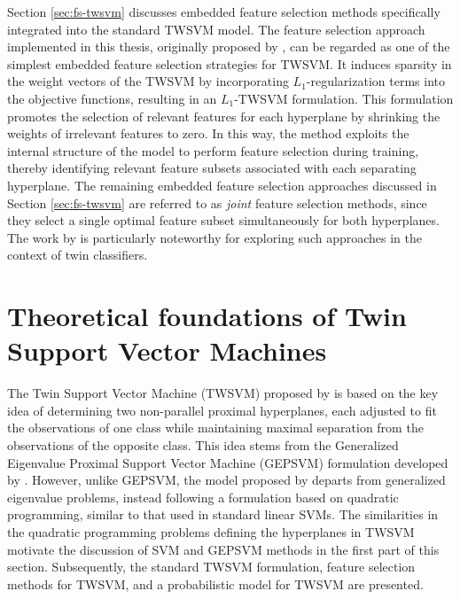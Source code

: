 \documentclass[12pt]{report} %
\begin{document}
Section \ref{sec:fs-twsvm} discusses embedded feature selection methods specifically integrated into the standard TWSVM model. The feature selection approach implemented in this thesis, originally proposed by \cite{bai2014novel}, can be regarded as one of the simplest embedded feature selection strategies for TWSVM. It induces sparsity in the weight vectors of the TWSVM by incorporating $L_1$-regularization terms into the objective functions, resulting in an $L_1$-TWSVM formulation. This formulation promotes the selection of relevant features for each hyperplane by shrinking the weights of irrelevant features to zero. In this way, the method exploits the internal structure of the model to perform feature selection during training, thereby identifying relevant feature subsets associated with each separating hyperplane. The remaining embedded feature selection approaches discussed in Section \ref{sec:fs-twsvm} are referred to as \textit{joint} feature selection methods, since they select a single optimal feature subset simultaneously for both hyperplanes. The work by \cite{maldonado2017synchronized} is particularly noteworthy for exploring such approaches in the context of twin classifiers.



\chapter{Theoretical foundations of Twin Support Vector Machines} \label{chap:foundations-twsvm}

The Twin Support Vector Machine (TWSVM) proposed by \cite{khemchandani2007twin} is based on the key idea of determining two non-parallel proximal hyperplanes, each adjusted to fit the observations of one class while maintaining maximal separation from the observations of the opposite class. This idea stems from the Generalized Eigenvalue Proximal Support Vector Machine (GEPSVM) formulation developed by \cite{mangasarian2006multisurface}. However, unlike GEPSVM, the model proposed by \cite{khemchandani2007twin} departs from generalized eigenvalue problems, instead following a formulation based on quadratic programming, similar to that used in standard linear SVMs. The similarities in the quadratic programming problems defining the hyperplanes in TWSVM motivate the discussion of SVM and GEPSVM methods in the first part of this section. Subsequently, the standard TWSVM formulation, feature selection methods for TWSVM, and a probabilistic model for TWSVM are presented.
 
\end{document}
